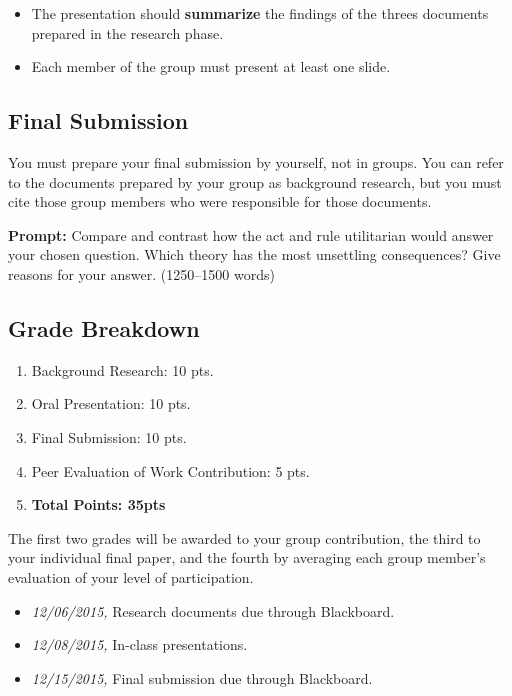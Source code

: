 \documentclass[10pt]{article}
\providecommand{\tightlist}{%
  \setlength{\itemsep}{0pt}\setlength{\parskip}{0pt}}
\begin{document}
\begin{itemize}
\tightlist
\item
  The presentation should \textbf{summarize} the findings of the threes
  documents prepared in the research phase.
\item
  Each member of the group must present at least one slide.
\end{itemize}

\subsection{Final Submission}\label{final-submission}

You must prepare your final submission by yourself, not in groups. You
can refer to the documents prepared by your group as background
research, but you must cite those group members who were responsible for
those documents.

\textbf{Prompt:} Compare and contrast how the act and rule utilitarian
would answer your chosen question. Which theory has the most unsettling
consequences? Give reasons for your answer. (1250--1500 words)

\subsection{Grade Breakdown}\label{grade-breakdown}

\begin{enumerate}
\def\labelenumi{\arabic{enumi}.}
\tightlist
\item
  Background Research: 10 pts.
\item
  Oral Presentation: 10 pts.
\item
  Final Submission: 10 pts.
\item
  Peer Evaluation of Work Contribution: 5 pts.
\item
  \textbf{Total Points: 35pts}
\end{enumerate}

The first two grades will be awarded to your group contribution, the
third to your individual final paper, and the fourth by averaging each
group member's evaluation of your level of participation.

\begin{itemize}

 \item \textit{12/06/2015,} Research documents due through Blackboard. 

\item \textit{12/08/2015,} In-class presentations.

\item \textit{12/15/2015,} Final submission due through Blackboard. 

\end{itemize}
\end{document}
